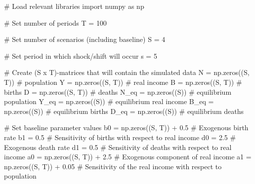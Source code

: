 \documentclass[
  letterpaper,
  DIV=11,
  numbers=noendperiod]{scrreprt}
\newenvironment{Shaded}{\begin{snugshade}}{\end{snugshade}}
\newcommand{\CommentTok}[1]{\textcolor[rgb]{0.37,0.37,0.37}{#1}}
\newcommand{\DecValTok}[1]{\textcolor[rgb]{0.68,0.00,0.00}{#1}}
\newcommand{\FloatTok}[1]{\textcolor[rgb]{0.68,0.00,0.00}{#1}}
\newcommand{\ImportTok}[1]{\textcolor[rgb]{0.00,0.46,0.62}{#1}}
\newcommand{\NormalTok}[1]{\textcolor[rgb]{0.00,0.23,0.31}{#1}}
\newcommand{\OperatorTok}[1]{\textcolor[rgb]{0.37,0.37,0.37}{#1}}
\begin{document}
\begin{tcolorbox}[enhanced jigsaw, titlerule=0mm, breakable, bottomrule=.15mm, toprule=.15mm, colbacktitle=quarto-callout-note-color!10!white, rightrule=.15mm, toptitle=1mm, opacityback=0, left=2mm, coltitle=black, title=\textcolor{quarto-callout-note-color}{\faInfo}\hspace{0.5em}{Python code}, colframe=quarto-callout-note-color-frame, opacitybacktitle=0.6, leftrule=.75mm, bottomtitle=1mm, arc=.35mm, colback=white]

\begin{Shaded}
\begin{Highlighting}[]
\CommentTok{\# Load relevant libraries}
\ImportTok{import}\NormalTok{ numpy }\ImportTok{as}\NormalTok{ np}

\CommentTok{\# Set number of periods}
\NormalTok{T }\OperatorTok{=} \DecValTok{100}

\CommentTok{\# Set number of scenarios (including baseline)}
\NormalTok{S }\OperatorTok{=} \DecValTok{4}

\CommentTok{\# Set period in which shock/shift will occur}
\NormalTok{s }\OperatorTok{=} \DecValTok{5}

\CommentTok{\# Create (S x T){-}matrices that will contain the simulated data}
\NormalTok{N }\OperatorTok{=}\NormalTok{ np.zeros((S, T))  }\CommentTok{\# population}
\NormalTok{Y }\OperatorTok{=}\NormalTok{ np.zeros((S, T))  }\CommentTok{\# real income}
\NormalTok{B }\OperatorTok{=}\NormalTok{ np.zeros((S, T))  }\CommentTok{\# births}
\NormalTok{D }\OperatorTok{=}\NormalTok{ np.zeros((S, T))  }\CommentTok{\# deaths}
\NormalTok{N\_eq }\OperatorTok{=}\NormalTok{ np.zeros((S))  }\CommentTok{\# equilibrium population}
\NormalTok{Y\_eq }\OperatorTok{=}\NormalTok{ np.zeros((S))  }\CommentTok{\# equilibrium real income}
\NormalTok{B\_eq }\OperatorTok{=}\NormalTok{ np.zeros((S))  }\CommentTok{\# equilibrium births}
\NormalTok{D\_eq }\OperatorTok{=}\NormalTok{ np.zeros((S))  }\CommentTok{\# equilibrium deaths}

\CommentTok{\# Set baseline parameter values}
\NormalTok{b0 }\OperatorTok{=}\NormalTok{ np.zeros((S, T)) }\OperatorTok{+} \FloatTok{0.5}  \CommentTok{\# Exogenous birth rate}
\NormalTok{b1 }\OperatorTok{=} \FloatTok{0.5}  \CommentTok{\# Sensitivity of births with respect to real income}
\NormalTok{d0 }\OperatorTok{=} \FloatTok{2.5}  \CommentTok{\# Exogenous death rate}
\NormalTok{d1 }\OperatorTok{=} \FloatTok{0.5}  \CommentTok{\# Sensitivity of deaths with respect to real income}
\NormalTok{a0 }\OperatorTok{=}\NormalTok{ np.zeros((S, T)) }\OperatorTok{+} \FloatTok{2.5}  \CommentTok{\# Exogenous component of real income}
\NormalTok{a1 }\OperatorTok{=}\NormalTok{ np.zeros((S, T)) }\OperatorTok{+} \FloatTok{0.05}  \CommentTok{\# Sensitivity of the real income with respect to population}


\end{Highlighting}
\end{Shaded}
\end{tcolorbox}
\end{document}
